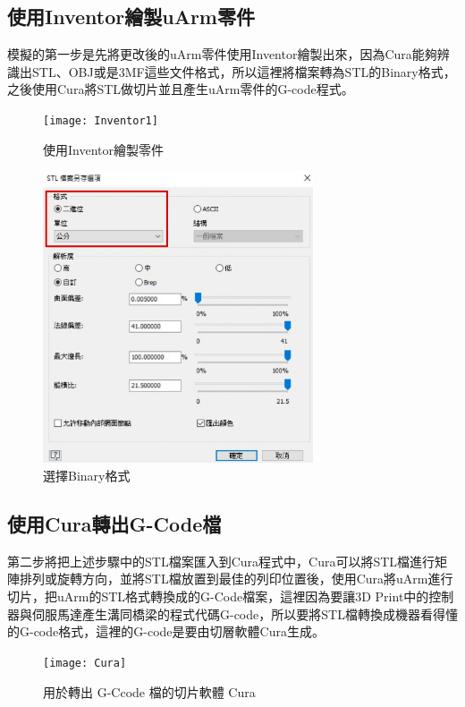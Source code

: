 \subsection{使用Inventor繪製uArm零件}
 模擬的第一步是先將更改後的uArm零件使用Inventor繪製出來，因為Cura能夠辨識出STL、OBJ或是3MF這些文件格式，所以這裡將檔案轉為STL的Binary格式，之後使用Cura將STL做切片並且產生uArm零件的G-code程式。\\
\begin{figure}[hbt!]
\begin{center}
\texttt{[image: Inventor1]}
\caption{\Large 使用Inventor繪製零件}\label{Inventor1}
\end{center}

\begin{center}
\includegraphics[width=8cm]{Inventor Binary format}
\caption{\Large 選擇Binary格式}\label{Inventor Binary format}
\end{center}
\end{figure}

\subsection{使用Cura轉出G-Code檔}
 第二步將把上述步驟中的STL檔案匯入到Cura程式中，Cura可以將STL檔進行矩陣排列或旋轉方向，並將STL檔放置到最佳的列印位置後，使用Cura將uArm進行切片，把uArm的STL格式轉換成的G-Code檔案，這裡因為要讓3D Print中的控制器與伺服馬達產生溝同橋梁的程式代碼G-code，所以要將STL檔轉換成機器看得懂的G-code格式，這裡的G-code是要由切層軟體Cura生成。\\
\begin{figure}[hbt!]
\begin{center}
\texttt{[image: Cura]}
\caption{\Large 用於轉出 G-Ccode 檔的切片軟體 Cura}\label{Cura}
\end{center}
\end{figure}
